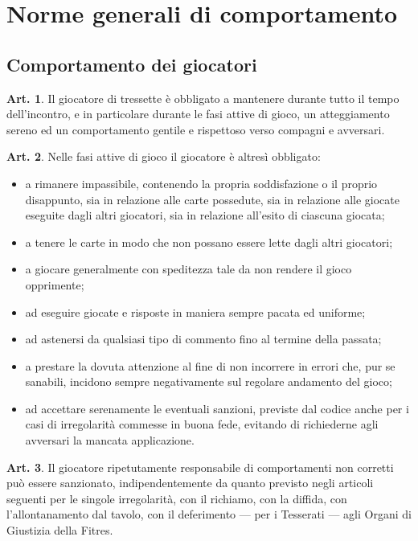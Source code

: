 \documentclass[italian,a4paper]{article}
\theoremstyle{definition}
\newtheorem{art}{Art.}
\newenvironment{packeditem}{
\begin{itemize}
  \setlength{\itemsep}{1pt}
  \setlength{\parskip}{0pt}
  \setlength{\parsep}{0pt}
}{\end{itemize}}
\begin{document}
\section{Norme generali di comportamento}
\subsection{Comportamento dei giocatori}
\begin{art}
    Il giocatore di tressette è obbligato a mantenere durante tutto il tempo dell'incontro, e in particolare durante le fasi attive di gioco, un atteggiamento sereno ed un comportamento gentile e rispettoso verso compagni e avversari.
\end{art}
\begin{art}
    Nelle fasi attive di gioco il giocatore è altresì obbligato:
    \begin{packeditem}
\item      a rimanere impassibile, contenendo la propria soddisfazione o il proprio disappunto, sia in relazione alle carte possedute, sia in relazione alle giocate eseguite dagli altri giocatori, sia in relazione all'esito di ciascuna giocata;
\item      a tenere le carte in modo che non possano essere lette dagli altri giocatori;
\item      a giocare generalmente con speditezza tale da non rendere il gioco opprimente;
\item      ad eseguire giocate e risposte in maniera sempre pacata ed uniforme;
\item      ad astenersi da qualsiasi tipo di commento fino al termine della passata;
\item       a prestare la dovuta attenzione al fine di non incorrere in errori che, pur se sanabili, incidono sempre negativamente sul regolare andamento del gioco;
\item      ad accettare serenamente le eventuali sanzioni, previste dal codice anche per i casi di irregolarità commesse in buona fede, evitando di richiederne agli avversari la mancata applicazione.
    \end{packeditem}
\end{art}
\begin{art}
    Il giocatore ripetutamente responsabile di comportamenti non corretti può
    essere sanzionato, indipendentemente da quanto previsto negli articoli
    seguenti per le singole irregolarità, con il richiamo, con la diffida, con
    l'allontanamento dal tavolo, con il deferimento --- per i Tesserati --- agli Organi di Giustizia della Fitres.
\end{art}
\end{document}

